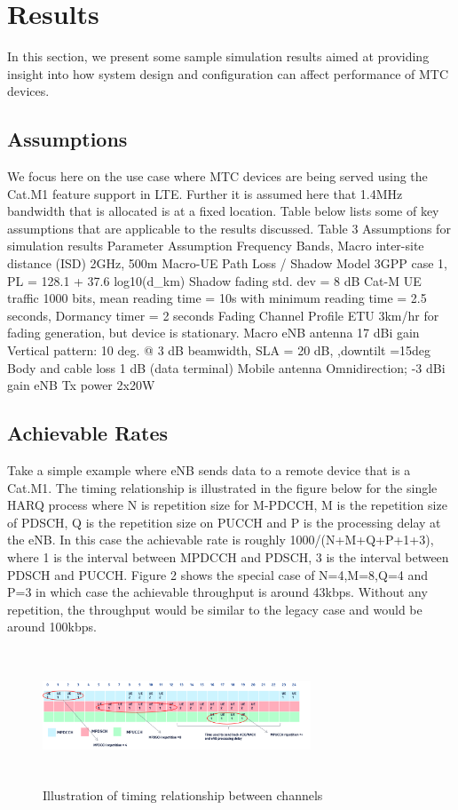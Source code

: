 \documentclass[conference,compsoc]{IEEEtran}
\begin{document}
\section{Results}
	In this section, we present some sample simulation results aimed at providing insight into how system design and configuration can affect performance of MTC devices.

\subsection{Assumptions}
We focus here on the use case where MTC devices are being served using the Cat.M1 feature support in LTE. Further it is assumed here that 1.4MHz bandwidth that is allocated is at a fixed location. Table below lists some of key assumptions that are applicable to the results discussed.
Table 3 Assumptions for simulation results
Parameter 	Assumption
Frequency Bands, Macro inter-site distance (ISD)
	2GHz, 500m
Macro-UE Path Loss / Shadow Model	3GPP case 1, PL = 128.1 + 37.6 log10(d\_km)
Shadow fading std. dev = 8 dB
Cat-M UE traffic	1000 bits, mean reading time = 10s with minimum reading time = 2.5 seconds, Dormancy timer = 2 seconds
Fading Channel Profile	ETU 3km/hr for fading generation, but device is stationary.
Macro eNB antenna	17 dBi gain
Vertical pattern: 10 deg. @ 3 dB beamwidth, SLA = 20 dB, ,downtilt =15deg
Body and cable loss	1 dB (data terminal)
Mobile antenna	Omnidirection; -3 dBi gain
eNB Tx power 	2x20W

\subsection{Achievable Rates}
 Take a simple example where eNB sends data to a remote device that is a Cat.M1. The timing relationship is illustrated in the figure below for the single HARQ process where N is repetition size for M-PDCCH, M is the repetition size of PDSCH, Q is the repetition size on PUCCH and P is the processing delay at the eNB.  In this case the achievable rate is roughly 1000/(N+M+Q+P+1+3), where 1 is the interval between MPDCCH and PDSCH, 3 is the interval between PDSCH and PUCCH.
Figure 2 shows the special case of N=4,M=8,Q=4 and P=3 in which case the achievable throughput is around 43kbps. Without any repetition, the throughput would be similar to the legacy case and would be around 100kbps.

\begin{figure}[htbp]
\centerline{\includegraphics[height=40mm,width=80mm]{timing_relation.png}}
\caption{Illustration of timing relationship between channels}
\label{fig_harq_timing}
\end{figure}
\end{document}
